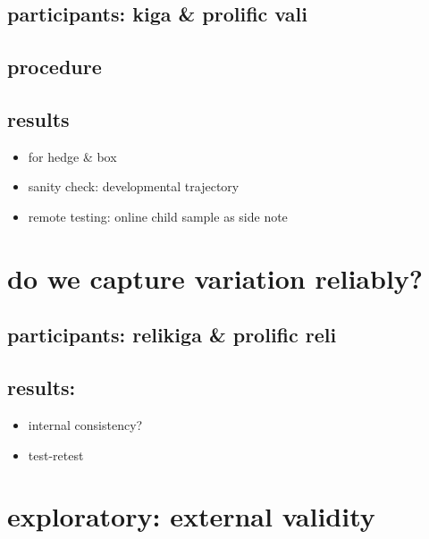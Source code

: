 \documentclass[
  english,
  man,floatsintext]{apa6}
\providecommand{\tightlist}{%
  \setlength{\itemsep}{0pt}\setlength{\parskip}{0pt}}
\begin{document}
\hypertarget{participants-kiga-prolific-vali}{%
\subsection{participants: kiga \& prolific vali}\label{participants-kiga-prolific-vali}}

\hypertarget{procedure}{%
\subsection{procedure}\label{procedure}}

\hypertarget{results}{%
\subsection{results}\label{results}}

\begin{itemize}
\tightlist
\item
  for hedge \& box
\item
  sanity check: developmental trajectory
\item
  remote testing: online child sample as side note
\end{itemize}

\hypertarget{do-we-capture-variation-reliably}{%
\section{do we capture variation reliably?}\label{do-we-capture-variation-reliably}}

\hypertarget{participants-relikiga-prolific-reli}{%
\subsection{participants: relikiga \& prolific reli}\label{participants-relikiga-prolific-reli}}

\hypertarget{results-1}{%
\subsection{results:}\label{results-1}}

\begin{itemize}
\tightlist
\item
  internal consistency?
\item
  test-retest
\end{itemize}

\hypertarget{exploratory-external-validity}{%
\section{exploratory: external validity}\label{exploratory-external-validity}}
\end{document}
